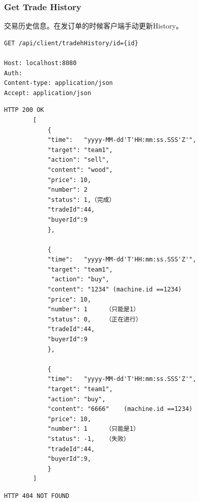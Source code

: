 \documentclass[12pt, a4paper,UTF8]{article}
\begin{document}
				\subsubsection{Get Trade History}
					交易历史信息。在发订单的时候客户端手动更新History。
\begin{lstlisting}
GET /api/client/tradehHistory/id={id}

Host: localhost:8080
Auth:
Content-type: application/json
Accept: application/json
\end{lstlisting}
\begin{lstlisting}
HTTP 200 OK
        [
            {
            "time":   "yyyy-MM-dd'T'HH:mm:ss.SSS'Z'",
            "target": "team1",
            "action": "sell",
            "content": "wood",
            "price": 10,
            "number": 2
            "status": 1,（完成）
            "tradeId":44,
            "buyerId":9
            },

            {
            "time":   "yyyy-MM-dd'T'HH:mm:ss.SSS'Z'",
            "target": "team1",
             "action": "buy",
            "content": "1234" (machine.id ==1234)
            "price": 10,
            "number": 1     （只能是1）
            "status": 0,    （正在进行）
            "tradeId":44,
            "buyerId":9
            },

            {
            "time":   "yyyy-MM-dd'T'HH:mm:ss.SSS'Z'",
            "target": "team1",
            "action": "buy",
            "content": "6666"    (machine.id ==1234)
            "price": 10,
            "number": 1     （只能是1）
            "status": -1,   （失败）
            "tradeId":44,
            "buyerId":9,
            }
        ]\end{lstlisting}
\begin{lstlisting}
HTTP 404 NOT FOUND
\end{lstlisting}
\end{document}
